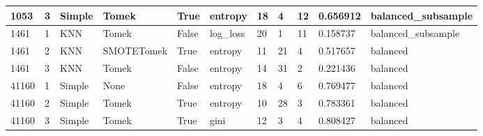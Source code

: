 \documentclass[11pt]{article}
\begin{document}
\begin{table}
\begin{tabularx}{22cm}{lllllllXXXX}
      1053 &       3 &  Simple &      Tomek &   True &   entropy &        18 &                     4 &                   12 &      0.656912 & balanced\_subsample \\
\midrule
      1461 &       1 &     KNN &      Tomek &  False &  log\_loss &        20 &                     1 &                   11 &      0.158737 & balanced\_subsample \\
      1461 &       2 &     KNN & SMOTETomek &   True &   entropy &        11 &                    21 &                    4 &      0.517657 &           balanced \\
      1461 &       3 &     KNN &      Tomek &  False &   entropy &        14 &                    31 &                    2 &      0.221436 &           balanced \\
\midrule
     41160 &       1 &  Simple &       None &  False &   entropy &        18 &                     4 &                    6 &      0.769477 &           balanced \\
     41160 &       2 &  Simple &      Tomek &   True &   entropy &        10 &                    28 &                    3 &      0.783361 &           balanced \\
     41160 &       3 &  Simple &      Tomek &   True &      gini &        12 &                     3 &                    4 &      0.808427 &           balanced \\
\bottomrule
\end{tabularx}
\end{table}
\end{document}
